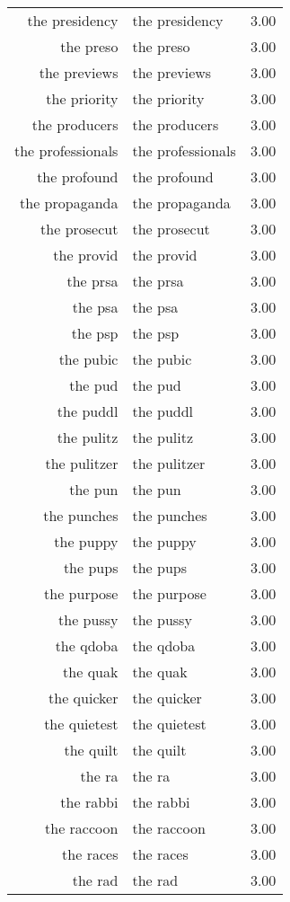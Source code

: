 \begin{table}[ht]
\begin{tabular}{rlr}
  the presidency & the presidency & 3.00 \\ 
  the preso & the preso & 3.00 \\ 
  the previews & the previews & 3.00 \\ 
  the priority & the priority & 3.00 \\ 
  the producers & the producers & 3.00 \\ 
  the professionals & the professionals & 3.00 \\ 
  the profound & the profound & 3.00 \\ 
  the propaganda & the propaganda & 3.00 \\ 
  the prosecut & the prosecut & 3.00 \\ 
  the provid & the provid & 3.00 \\ 
  the prsa & the prsa & 3.00 \\ 
  the psa & the psa & 3.00 \\ 
  the psp & the psp & 3.00 \\ 
  the pubic & the pubic & 3.00 \\ 
  the pud & the pud & 3.00 \\ 
  the puddl & the puddl & 3.00 \\ 
  the pulitz & the pulitz & 3.00 \\ 
  the pulitzer & the pulitzer & 3.00 \\ 
  the pun & the pun & 3.00 \\ 
  the punches & the punches & 3.00 \\ 
  the puppy & the puppy & 3.00 \\ 
  the pups & the pups & 3.00 \\ 
  the purpose & the purpose & 3.00 \\ 
  the pussy & the pussy & 3.00 \\ 
  the qdoba & the qdoba & 3.00 \\ 
  the quak & the quak & 3.00 \\ 
  the quicker & the quicker & 3.00 \\ 
  the quietest & the quietest & 3.00 \\ 
  the quilt & the quilt & 3.00 \\ 
  the ra & the ra & 3.00 \\ 
  the rabbi & the rabbi & 3.00 \\ 
  the raccoon & the raccoon & 3.00 \\ 
  the races & the races & 3.00 \\ 
  the rad & the rad & 3.00 \\ 

\end{tabular}
\end{table}
